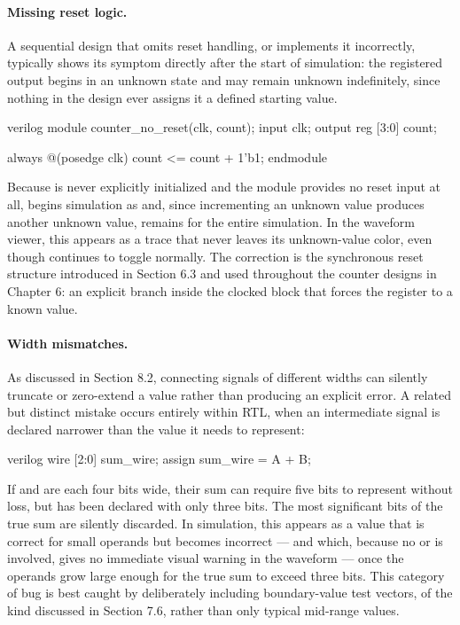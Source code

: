 \paragraph{Missing reset logic.} A sequential design that omits reset handling, or implements it incorrectly, typically shows its symptom directly after the start of simulation: the registered output begins in an unknown  state and may remain unknown indefinitely, since nothing in the design ever assigns it a defined starting value.

\begin{codeblock}{verilog}
module counter_no_reset(clk, count);
    input clk;
    output reg [3:0] count;

    always @(posedge clk)
        count <= count + 1'b1;
endmodule
\end{codeblock}

Because  is never explicitly initialized and the module provides no reset input at all,  begins simulation as  and, since incrementing an unknown value produces another unknown value, remains  for the entire simulation. In the waveform viewer, this appears as a trace that never leaves its unknown-value color, even though  continues to toggle normally. The correction is the synchronous reset structure introduced in Section 6.3 and used throughout the counter designs in Chapter 6: an explicit  branch inside the clocked  block that forces the register to a known value.\\

\paragraph{Width mismatches.} As discussed in Section 8.2, connecting signals of different widths can silently truncate or zero-extend a value rather than producing an explicit error. A related but distinct mistake occurs entirely within RTL, when an intermediate signal is declared narrower than the value it needs to represent:

\begin{codeblock}{verilog}
wire [2:0] sum_wire;
assign sum_wire = A + B;
\end{codeblock}

If  and  are each four bits wide, their sum can require five bits to represent without loss, but  has been declared with only three bits. The most significant bits of the true sum are silently discarded. In simulation, this appears as a  value that is correct for small operands but becomes incorrect --- and which, because no  or  is involved, gives no immediate visual warning in the waveform --- once the operands grow large enough for the true sum to exceed three bits. This category of bug is best caught by deliberately including boundary-value test vectors, of the kind discussed in Section 7.6, rather than only typical mid-range values.\\


